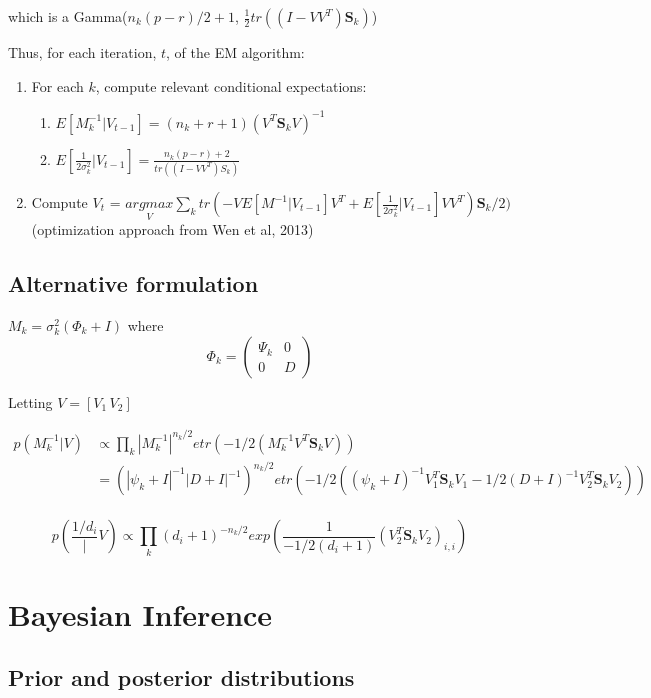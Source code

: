 \documentclass{article}
\begin{document}
\noindent which is a Gamma($n_k(p-r)/2+1$, $\frac{1}{2}tr((I-VV^T)\mathbf{S}_k)$)

\noindent Thus, for each iteration, $t$, of the EM algorithm:

\begin{enumerate}
\item For each $k$, compute relevant conditional expectations:
\begin{enumerate}
\item $E[M_k^{-1} | V_{t-1}] = (n_k + r  + 1)(V^T \mathbf{S}_kV)^{-1}$
\item $E[\frac{1}{2\sigma_k^2}|V_{t-1}] = \frac{n_k(p-r) + 2}{tr((I-VV^T)S_k)}$
\end{enumerate}
\item Compute $V_{t}$ = $\underset{V}{argmax}  \sum_k tr\left(-VE[M^{-1}|V_{t-1}]V^T +
       E[\frac{1}{2\sigma_k^2}|V_{t-1}]VV^T\right)\mathbf{S}_k/2)$ (optimization
  approach from Wen et al, 2013)
\end{enumerate}

\subsection{Alternative formulation}
$M_k = \sigma_k^2(\Phi_k + I)$ where 
$$ \Phi_k =\left( \begin{array}{cc}
\Psi_k & 0  \\
0 & D  \end{array} \right)$$

Letting $V = [V_1\, V_2]$

\begin{eqnarray*}
p(M_k^{-1} | V) &\propto \prod_k |M_k^{-1}|^{n_k/2}etr(-1/2(M_k^{-1}V^T\mathbf{S}_kV)) \\
                & = (|\psi_k + I|^{-1}|D +
                  I|^{-1})^{n_k/2}etr(-1/2((\psi_k+I)^{-1}V_1^T\mathbf{S}_kV_1
                  -1/2(D+I)^{-1}V_2^T\mathbf{S}_kV_2)) \\
\end{eqnarray*}


$$p(\frac{1/d_i} | V) \propto \prod_k (d_i + 1)^{-n_k/2}exp\left(\frac{1}{-1/2(d_i+1)}(V_2^T\mathbf{S}_kV_2)_{i,i}\right) $$


\section{Bayesian Inference}

\subsection{Prior and posterior distributions}
\end{document}
